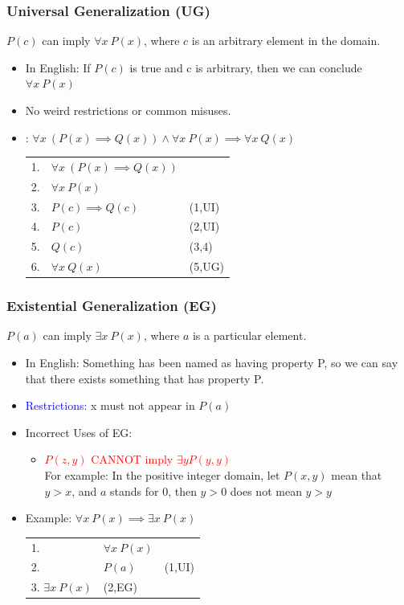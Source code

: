 \documentclass[12pt, letterpaper]{article}
\newcommand{\cul}[1]{%
		\uline{\phantom{#1}}%
		\llap{\contour{white}{#1}}%
	}
\begin{document}
\subsubsection*{Universal Generalization (UG)}
$P(c)$ can imply $\forall x \ P(x)$, where $c$ is an arbitrary element in the domain.
\begin{itemize}[label={}, leftmargin=0.3cm]
	\item In English: If $P(c)$ is true and c is arbitrary, then we can conclude $\forall x \ P(x)$
	\item No weird restrictions or common misuses.
	\item \cul{Example}: $\forall x \ (P(x) \implies Q(x)) \land \forall x \ P(x) \implies \forall x \ Q(x)$
	\begin{center}
		\begin{tabular}{l l l}
			1. & $\forall x \ (P(x) \implies Q(x))$ & \\
			2. & $\forall x \ P(x)$ & \\
			3. & $P(c) \implies Q(c)$ & (1,UI) \\
			4. & $P(c)$ & (2,UI) \\
			5. & $Q(c)$ & (3,4) \\
			6. & $\forall x \ Q(x)$ & (5,UG)
		\end{tabular}
	\end{center}
\end{itemize}

\pagebreak

\subsubsection*{Existential Generalization (EG)}
$P(a)$ can imply $\exists x \ P(x)$, where $a$ is a particular element.
\begin{itemize}[label={}, leftmargin=0.3cm]
	\item In English: Something has been named as having property P, so we can say that there exists something that has property P.
	\item \textcolor{blue}{Restrictions:} x must not appear in $P(a)$
	\item Incorrect Uses of EG:
	\begin{itemize}
		\item \textcolor{red}{$P(z,y)$ CANNOT imply $\exists y P(y,y)$} \\ For example: In the positive integer domain, let $P(x,y)$ mean that $y > x$, and $a$ stands for 0, then $y>0$ does not mean $y>y$
	\end{itemize}
	\item Example: $\forall x \ P(x) \implies \exists x \ P(x)$
	\begin{center}
		\begin{tabular}{l l l}
			1. & $\forall x \ P(x)$ & \\
			2. & $P(a)$  & (1,UI) \\
			3. $\exists x \ P(x)$ & (2,EG)
		\end{tabular}
	\end{center}
\end{itemize}
\end{document}
